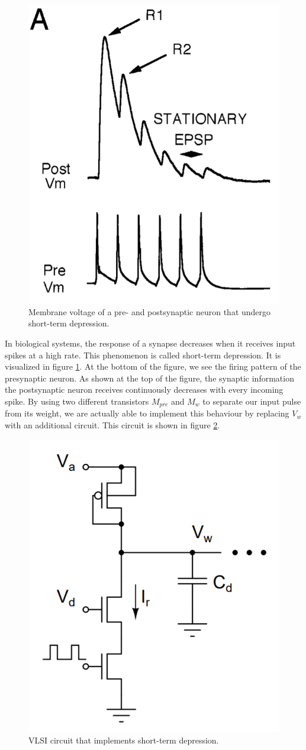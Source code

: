 \begin{figure}
    \centering
    \includegraphics[width=.4\linewidth]{Figures/short_term_depression_data.PNG}
    \caption{Membrane voltage of a pre- and postsynaptic neuron that undergo short-term depression.}
    \label{fig:short_term_depression_data}
\end{figure}

In biological systems, the response of a synapse decreases when it receives input spikes at a high rate. This phenomenon is called short-term depression. It is visualized in figure \ref{fig:short_term_depression_data}. At the bottom of the figure, we see the firing pattern of the presynaptic neuron. As shown at the top of the figure, the synaptic information the postsynaptic neuron receives continuously decreases with every incoming spike.  By using two different transistors $M_{pre}$ and $M_w$ to separate our input pulse from its weight, we are actually able to implement this behaviour by replacing $V_w$ with an additional circuit. This circuit is shown in figure \ref{fig:short_term_depression_circuit}.\\

\begin{figure}
    \centering
    \includegraphics[width=.5\linewidth]{Figures/short_term_depression_circuit.PNG}
    \caption{VLSI circuit that implements short-term depression.}
    \label{fig:short_term_depression_circuit}
\end{figure}

